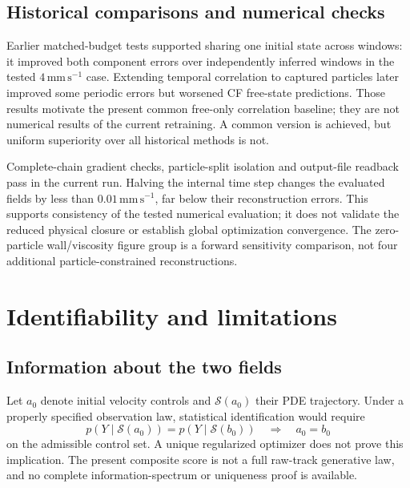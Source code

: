 \documentclass[11pt]{article}
\numberwithin{equation}{section}
\begin{document}
\subsection{Historical comparisons and numerical checks}

Earlier matched-budget tests supported sharing one initial state across windows: it improved both component errors over independently inferred windows in the tested $4\,\mathrm{mm\,s^{-1}}$ case. Extending temporal correlation to captured particles later improved some periodic errors but worsened CF free-state predictions. Those results motivate the present common free-only correlation baseline; they are not numerical results of the current retraining. A common version is achieved, but uniform superiority over all historical methods is not.

Complete-chain gradient checks, particle-split isolation and output-file readback pass in the current run. Halving the internal time step changes the evaluated fields by less than $0.01\,\mathrm{mm\,s^{-1}}$, far below their reconstruction errors. This supports consistency of the tested numerical evaluation; it does not validate the reduced physical closure or establish global optimization convergence. The zero-particle wall/viscosity figure group is a forward sensitivity comparison, not four additional particle-constrained reconstructions.

\section{Identifiability and limitations}
\label{sec:limitations}

\subsection{Information about the two fields}

Let $a_0$ denote initial velocity controls and $\mathcal S(a_0)$ their PDE trajectory. Under a properly specified observation law, statistical identification would require
\begin{equation}
 p(Y\mid\mathcal S(a_0))=p(Y\mid\mathcal S(b_0))
 \quad\Longrightarrow\quad a_0=b_0
 \label{eq:identifiability}
\end{equation}
on the admissible control set. A unique regularized optimizer does not prove this implication. The present composite score is not a full raw-track generative law, and no complete information-spectrum or uniqueness proof is available.
\end{document}
